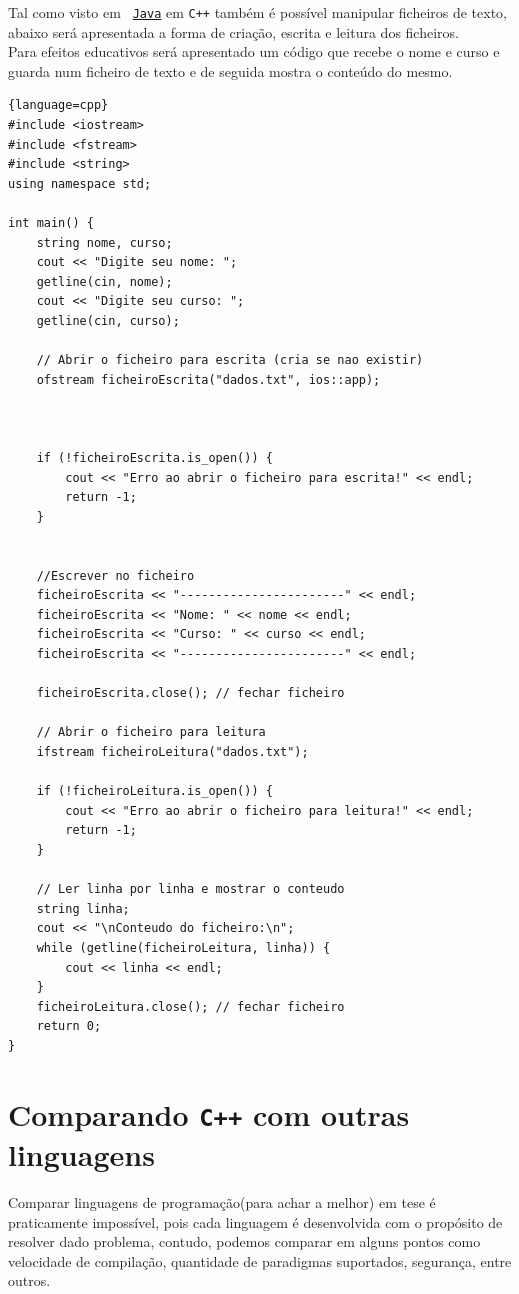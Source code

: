 \documentclass[a4paper,12pt]{article}
\begin{document}
  Tal como visto em \texttt{
	\href{https://www.java.com/en/}{Java}} em
  \texttt{C++} também é possível manipular ficheiros de texto, abaixo será 
  apresentada a forma de criação, escrita e
  leitura dos ficheiros.\\ Para efeitos educativos será apresentado um código que recebe o nome e curso e guarda 
  num ficheiro de texto e de seguida mostra o conteúdo do mesmo.\newline\begin{lstlisting}{language=cpp}
#include <iostream>
#include <fstream>
#include <string>
using namespace std;

int main() {
    string nome, curso;
    cout << "Digite seu nome: ";
    getline(cin, nome);
    cout << "Digite seu curso: ";
    getline(cin, curso);

    // Abrir o ficheiro para escrita (cria se nao existir)
    ofstream ficheiroEscrita("dados.txt", ios::app); 


	
    if (!ficheiroEscrita.is_open()) {
        cout << "Erro ao abrir o ficheiro para escrita!" << endl;
        return -1;
    }


    //Escrever no ficheiro
    ficheiroEscrita << "-----------------------" << endl;
    ficheiroEscrita << "Nome: " << nome << endl;
    ficheiroEscrita << "Curso: " << curso << endl;
    ficheiroEscrita << "-----------------------" << endl;

    ficheiroEscrita.close(); // fechar ficheiro

    // Abrir o ficheiro para leitura
    ifstream ficheiroLeitura("dados.txt");

    if (!ficheiroLeitura.is_open()) {
        cout << "Erro ao abrir o ficheiro para leitura!" << endl;
        return -1;
    }

    // Ler linha por linha e mostrar o conteudo
    string linha;
    cout << "\nConteudo do ficheiro:\n";
    while (getline(ficheiroLeitura, linha)) {
        cout << linha << endl;
    }
    ficheiroLeitura.close(); // fechar ficheiro
    return 0;
}
\end{lstlisting}


\newpage

\section{Comparando \texttt{C++} com outras linguagens}
Comparar linguagens de programação(para achar a melhor) em tese é 
praticamente impossível, pois cada linguagem é desenvolvida com o propósito de
resolver dado problema, contudo, podemos comparar em alguns pontos como velocidade
de compilação, quantidade de paradigmas suportados, segurança, entre outros.
\end{document}
